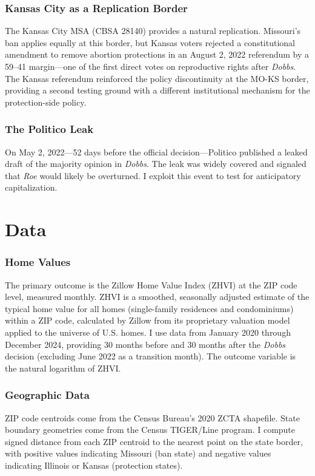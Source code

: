 \documentclass[12pt]{article}
\begin{document}
\subsubsection*{Kansas City as a Replication Border} The Kansas City MSA (CBSA 28140) provides a natural replication. Missouri's ban applies equally at this border, but Kansas voters rejected a constitutional amendment to remove abortion protections in an August 2, 2022 referendum by a 59--41 margin---one of the first direct votes on reproductive rights after \textit{Dobbs}. The Kansas referendum reinforced the policy discontinuity at the MO-KS border, providing a second testing ground with a different institutional mechanism for the protection-side policy.

\subsubsection*{The Politico Leak} On May 2, 2022---52 days before the official decision---Politico published a leaked draft of the majority opinion in \textit{Dobbs}. The leak was widely covered and signaled that \textit{Roe} would likely be overturned. I exploit this event to test for anticipatory capitalization.

\section{Data}
\label{sec:data}

\subsubsection*{Home Values} The primary outcome is the Zillow Home Value Index (ZHVI) at the ZIP code level, measured monthly. ZHVI is a smoothed, seasonally adjusted estimate of the typical home value for all homes (single-family residences and condominiums) within a ZIP code, calculated by Zillow from its proprietary valuation model applied to the universe of U.S. homes. I use data from January 2020 through December 2024, providing 30 months before and 30 months after the \textit{Dobbs} decision (excluding June 2022 as a transition month). The outcome variable is the natural logarithm of ZHVI.

\subsubsection*{Geographic Data} ZIP code centroids come from the Census Bureau's 2020 ZCTA shapefile. State boundary geometries come from the Census TIGER/Line program. I compute signed distance from each ZIP centroid to the nearest point on the state border, with positive values indicating Missouri (ban state) and negative values indicating Illinois or Kansas (protection states).
\end{document}
